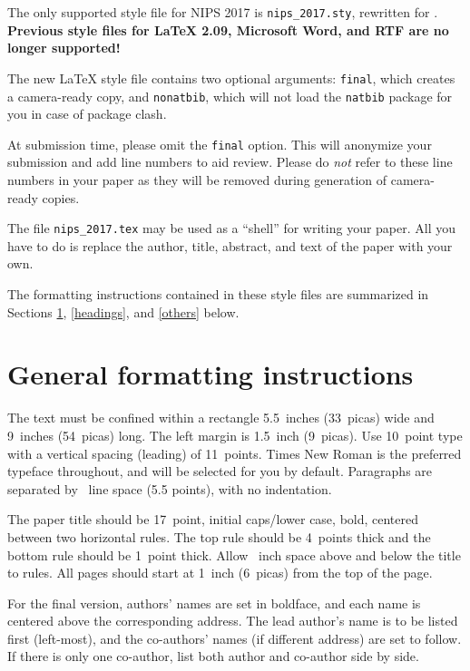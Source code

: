 \documentclass[final]{article}
\begin{document}
\begin{itemize}
The only supported style file for NIPS 2017 is \verb+nips_2017.sty+,
rewritten for \LaTeXe{}.  \textbf{Previous style files for \LaTeX{}
  2.09, Microsoft Word, and RTF are no longer supported!}

The new \LaTeX{} style file contains two optional arguments:
\verb+final+, which creates a camera-ready copy, and \verb+nonatbib+,
which will not load the \verb+natbib+ package for you in case of
package clash.

At submission time, please omit the \verb+final+ option. This will
anonymize your submission and add line numbers to aid review.  Please
do \emph{not} refer to these line numbers in your paper as they will
be removed during generation of camera-ready copies.

The file \verb+nips_2017.tex+ may be used as a ``shell'' for writing
your paper. All you have to do is replace the author, title, abstract,
and text of the paper with your own.

The formatting instructions contained in these style files are
summarized in Sections \ref{gen_inst}, \ref{headings}, and
\ref{others} below.

\section{General formatting instructions}
\label{gen_inst}

The text must be confined within a rectangle 5.5~inches (33~picas)
wide and 9~inches (54~picas) long. The left margin is 1.5~inch
(9~picas).  Use 10~point type with a vertical spacing (leading) of
11~points.  Times New Roman is the preferred typeface throughout, and
will be selected for you by default.  Paragraphs are separated by
~line space (5.5 points), with no indentation.

The paper title should be 17~point, initial caps/lower case, bold,
centered between two horizontal rules. The top rule should be 4~points
thick and the bottom rule should be 1~point thick. Allow
~inch space above and below the title to rules. All
pages should start at 1~inch (6~picas) from the top of the page.

For the final version, authors' names are set in boldface, and each
name is centered above the corresponding address. The lead author's
name is to be listed first (left-most), and the co-authors' names (if
different address) are set to follow. If there is only one co-author,
list both author and co-author side by side.


\end{itemize}
\end{document}

